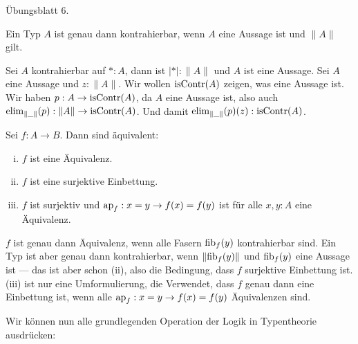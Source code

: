 \begin{beweis}
  Übungsblatt 6.
\end{beweis}

\begin{lemma}
  Ein Typ $A$ ist genau dann kontrahierbar, wenn $A$ eine Aussage ist und $\|A\|$ gilt.
\end{lemma}

\begin{beweis}
  Sei $A$ kontrahierbar auf $\ast:A$, dann ist $|\ast|:\|A\|$ und $A$ ist eine Aussage.
  Sei $A$ eine Aussage und $z:\|A\|$. Wir wollen $\mathrm{isContr}(A)$ zeigen, was eine Aussage ist.
  Wir haben $p:A\to \mathrm{isContr}(A)$, da $A$ eine Aussage ist, also auch $\mathrm{elim}_{\|\_\|}(p):\|A\|\to \mathrm{isContr}(A)$. Und damit $\mathrm{elim}_{\|\_\|}(p)(z):\mathrm{isContr}(A)$.
\end{beweis}

\begin{lemma}
  Sei $f:A\to B$. Dann sind äquivalent:
  \begin{enumerate}[(i)]
  \item $f$ ist eine Äquivalenz.
  \item $f$ ist eine surjektive Einbettung.
  \item $f$ ist surjektiv und $\mathrm{ap}_f:x=y\to f(x)=f(y)$ ist für alle $x,y:A$ eine Äquivalenz.
  \end{enumerate}
\end{lemma}

\begin{beweis}
  $f$ ist genau dann Äquivalenz, wenn alle Fasern $\mathrm{fib}_f(y)$ kontrahierbar sind.
  Ein Typ ist aber genau dann kontrahierbar, wenn $\|\mathrm{fib}_f(y)\|$ und $\mathrm{fib}_f(y)$ eine Aussage ist ---
  das ist aber schon (ii), also die Bedingung, dass $f$ surjektive Einbettung ist.
  (iii) ist nur eine Umformulierung, die Verwendet, dass $f$ genau dann eine Einbettung ist, wenn alle $\mathrm{ap}_f:x=y\to f(x)=f(y)$ Äquivalenzen sind.
\end{beweis}


Wir können nun alle grundlegenden Operation der Logik in Typentheorie ausdrücken:


